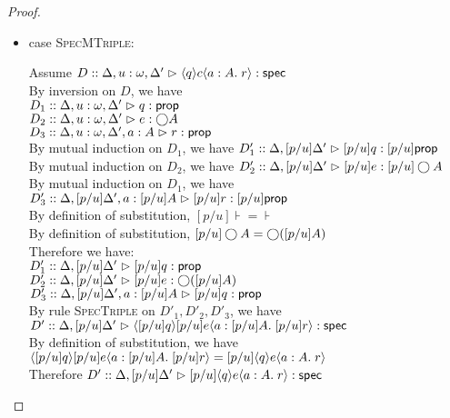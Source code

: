 \begin{proof}
\begin{enumerate}
\begin{itemize}
    \item case \textsc{SpecMTriple}:
      \begin{tabbedproof}
        \oo Assume $D :: \judgeS[{\Delta, u:\omega, \Delta'}]{\mspec{q}{c}{a:A}{r}}$ \\
        \ooo By inversion on $D$, we have \\
        \oooo $D_1 :: \judgeA[{\Delta, u:\omega, \Delta'}]{q}{\assert}$ \\
        \oooo $D_2 :: \judgeA[{\Delta, u:\omega, \Delta'}]{e}{\monad{A}}$ \\
        \oooo $D_3 :: \judgeA[{\Delta, u:\omega, \Delta', a:A}]{r}{\assert}$ \\
        \ooo By mutual induction on $D_1$, we have 
             $D'_1 :: \judgeA[{\Delta, [p/u]\Delta'}]{[p/u]q}{[p/u]\assert}$ \\
        \ooo By mutual induction on $D_2$, we have 
             $D'_2 :: \judgeA[{\Delta, [p/u]\Delta'}]{[p/u]e}{[p/u]\monad{A}}$ \\
        \ooo By mutual induction on $D_1$, we have 
             $D'_3 :: \judgeA[{\Delta, [p/u]\Delta', a:[p/u]A}]{[p/u]r}{[p/u]\assert}$ \\
        \ooo By definition of substitution, $[p/u]\assert = \assert$ \\
        \ooo By definition of substitution, $[p/u]\monad{A} = \monad{([p/u]A)}$ \\
        \ooo Therefore we have:\\
        \oooo $D'_1 :: \judgeA[{\Delta, [p/u]\Delta'}]{[p/u]q}{\assert}$ \\
        \oooo $D'_2 :: \judgeA[{\Delta, [p/u]\Delta'}]{[p/u]e}{\monad{([p/u]A)}}$ \\
        \oooo $D'_3 :: \judgeA[{\Delta, [p/u]\Delta', a:[p/u]A}]{[p/u]q}{\assert}$ \\
        \ooo By rule \textsc{SpecTriple} on $D'_1, D'_2, D'_3$, we have \\
        \oox $D' :: \judgeS[{\Delta, [p/u]\Delta'}]
                            {\mspec{[p/u]q}{[p/u]e}{a:[p/u]A}{[p/u]r}}$ \\
        \ooo By definition of substitution, we have \\
        \oox $\mspec{[p/u]q}{[p/u]e}{a:[p/u]A}{[p/u]r} = [p/u]\mspec{q}{e}{a:A}{r}$ \\
        \ooo Therefore $D' :: \judgeS[{\Delta, [p/u]\Delta'}]{[p/u]\mspec{q}{e}{a:A}{r}}$ \\
      \end{tabbedproof}


\end{itemize}
\end{enumerate}
\end{proof}
